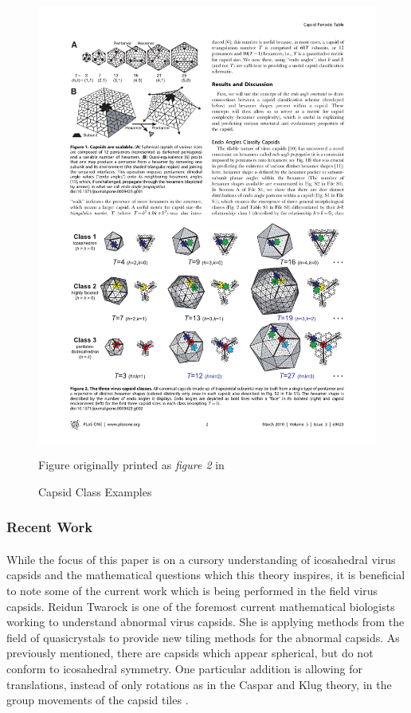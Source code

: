 \documentclass[12pt,letter]{article}
\begin{document}
\begin{figure}[h!]
	\centering
	\caption{Capsid Class Examples}
	\includegraphics[width = .9\textwidth]{class_ex.pdf}
	\begin{minipage}[h]{.9\textwidth}
		\centering
		\begin{footnotesize}
		Figure originally printed as \textit{figure 2} in \cite{Mannige:2010}
		\end{footnotesize}
	\end{minipage}
	\label{fig:class_ex}
\end{figure}

\subsubsection{Recent Work}
\paragraph{}
While the focus of this paper is on a cursory understanding of icosahedral virus capsids and the mathematical questions which this theory inspires, it is beneficial to note some of the current work which is being performed in the field virus capsids. Reidun Twarock is one of the foremost current mathematical biologists working to understand abnormal virus capsids. She is applying methods from the field of quasicrystals to provide new tiling methods for the abnormal capsids. As previously mentioned, there are capsids which appear spherical, but do not conform to icosahedral symmetry. One particular addition is allowing for translations, instead of only rotations as in the Caspar and Klug theory, in the group movements of the capsid tiles \cite{Twarock:2004} \cite{Twarock:2006}. 
\end{document}
